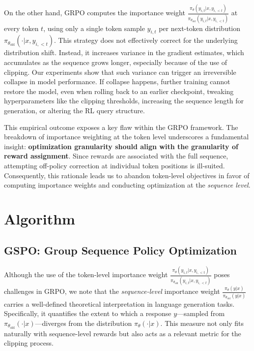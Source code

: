 On the other hand, GRPO computes the importance weight $\frac{ \pi_{\theta} (y_{i,t} | x, y_{i,<t}) }{ \pi_{\theta_\text{old}} (y_{i,t} | x,y_{i,<t})}$ at every token $t$, using only a single token sample $y_{i,t}$ per next-token distribution $\pi_{\theta_\text{old}}( \cdot | x, y_{i, <t})$. This strategy does not effectively correct for the underlying distribution shift. Instead, it increases variance in the gradient estimates, which accumulates as the sequence grows longer, especially because of the use of clipping. Our experiments show that such variance can trigger an irreversible collapse in model performance. If collapse happens, further training cannot restore the model, even when rolling back to an earlier checkpoint, tweaking hyperparameters like the clipping thresholds, increasing the sequence length for generation, or altering the RL query structure.

This empirical outcome exposes a key flaw within the GRPO framework. The breakdown of importance weighting at the token level underscores a fundamental insight: \textbf{optimization granularity should align with the granularity of reward assignment}. Since rewards are associated with the full sequence, attempting off-policy correction at individual token positions is ill-suited. Consequently, this rationale leads us to abandon token-level objectives in favor of computing importance weights and conducting optimization at the \textit{sequence level}.

\section{Algorithm}

\subsection{GSPO: Group Sequence Policy Optimization}

Although the use of the token-level importance weight $\frac{ \pi_{\theta} (y_{i,t} | x, y_{i,<t}) }{ \pi_{\theta_\text{old}} (y_{i,t} | x,y_{i,<t})}$ poses challenges in GRPO, we note that the \textit{sequence-level} importance weight $\frac{ \pi_{\theta} (y | x) }{ \pi_{\theta_\text{old}} (y | x)}$ carries a well-defined theoretical interpretation in language generation tasks. Specifically, it quantifies the extent to which a response $y$—sampled from $\pi_{\theta_\text{old}} (\cdot | x)$—diverges from the distribution $\pi_{\theta} (\cdot | x)$. This measure not only fits naturally with sequence-level rewards but also acts as a relevant metric for the clipping process.

